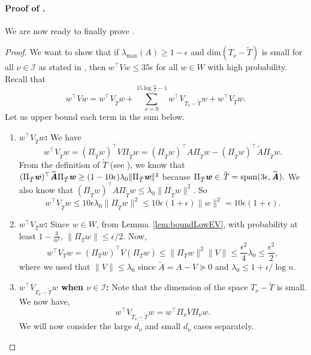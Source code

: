 \documentclass[11pt]{article}
\let\originalleft\left
\let\originalright\right
\renewcommand{\left}{\mathopen{}\mathclose\bgroup\originalleft}
\renewcommand{\right}{\aftergroup\egroup\originalright}
\def\dim#1{\mathrm{dim} (#1)}
\newcommand\ww{\boldsymbol{\mathit{w}}}
\renewcommand\AA{\boldsymbol{\mathit{A}}}
\newcommand\WW{\boldsymbol{\mathit{W}}}
\newcommand\VV{\boldsymbol{\mathit{V}}}
\newcommand\Ttil{{\tilde{\mathit{T}}}}
\newcommand\AAtil{\boldsymbol{\widetilde{\mathit{A}}}}
\newcommand\Span{\mathrm{span}}
\begin{document}
\paragraph{Proof of .}
 We are now ready to finally prove .

\begin{proof}

We want to show that if $\lambda_{\max}(\AA)\geq 1- \epsilon$ and $\dim{T_{\nu}-\tilde{T}}$ is small for all $\nu\in \mathcal{I}$ as stated in , then $\ww^{\top}\VV\ww\leq 35 \epsilon$ for all $\ww\in \WW$ with high probability. Recall that
\[
\ww^{\top}\VV\ww = \ww^{\top}\VV_{\tilde{T}}\ww+\sum_{\nu = 0}^{15\log\frac{n}{\epsilon}-1}\ww^{\top}\VV_{T_{\nu} -\tilde{T}}\ww+ \ww^{\top}\VV_{\overline{T}}\ww.
\]
Let us upper bound each term in the sum below.
\begin{enumerate}
    
    \item \textbf{$\ww^\top\VV_{\tilde{T}}\ww$:} 
    We have 
    \[
        \ww^\top \VV_{\Ttil} \ww = (\Pi_{\tilde{T}}\ww)^{\top}\VV\Pi_{\tilde{T}}\ww =
        (\Pi_{\tilde{T}}\ww)^{\top}\AA\Pi_{\tilde{T}}\ww - (\Pi_{\tilde{T}}\ww)^{\top}\AAtil\Pi_{\tilde{T}}\ww. 
    \]
    From the definition of $\tilde{T}$ (see ), we know that $(\Pi_{\tilde{T}}\ww)^{\top}\AAtil\Pi_{\tilde{T}}\ww \geq \left(1-10\epsilon\right)\lambda_0\|\Pi_{\tilde{T}}\ww\|^2 $ because $\Pi_{\tilde{T}}\ww \in \Ttil = \Span(3\eps,\AAtil).$
    We also know that $(\Pi_{\tilde{T}}\ww)^{\top}\AA\Pi_{\tilde{T}}\ww \leq \lambda_0 \|\Pi_{\tilde{T}}\ww\|^2$. So 
    \begin{equation}\label{eq:V2}
    \ww^{\top}\VV_{\tilde{T}}\ww \leq 10\epsilon\lambda_0 \|\Pi_{\tilde{T}}\ww\|^2\leq 10\epsilon(1+\epsilon)\|\ww\|^2 =10\epsilon (1+\epsilon).
  \end{equation}
\item \textbf{$\ww^\top\VV_{\overline{T}}\ww$:} Since $\ww\in \WW$, from Lemma~\ref{lem:boundLowEV}, with probability at least $1-\frac{3}{n^2}$, $\|\Pi_{\overline{T}}\ww\|\leq \epsilon/2$. Now, 
    \begin{equation}\label{eq:V1}
        \ww^{\top}\VV_{\overline{T}}\ww = (\Pi_{\overline{T}}\ww)^{\top}\VV(\Pi_{\overline{T}}\ww)\leq \|\Pi_{\overline{T}}\ww\|^2\|\VV\| \leq \frac{\epsilon^2}{4}\lambda_0 \leq \frac{\epsilon^2}{2},
    \end{equation}
    where we used that $\|\VV\|\leq \lambda_0$ since $\AAtil = \AA-\VV \succeq 0$ and $\lambda_0\leq 1+\epsilon/\log n$.
\item \textbf{$\ww^\top\VV_{T_{\nu} -\tilde{T}}\ww$ when $\nu \in \mathcal{I}$:} Note that the dimension of the space $T_{\nu} -\tilde{T}$ is small. We now have,
    \[
    \ww^{\top}\VV_{T_{\nu} -\tilde{T}}\ww = \ww^{\top}\Pi_{\nu}\VV\Pi_{\nu}\ww.
    \]
    We will now consider the large $d_{\nu}$ and small $d_{\nu}$ cases separately.

\end{enumerate}
\end{proof}
\end{document}
